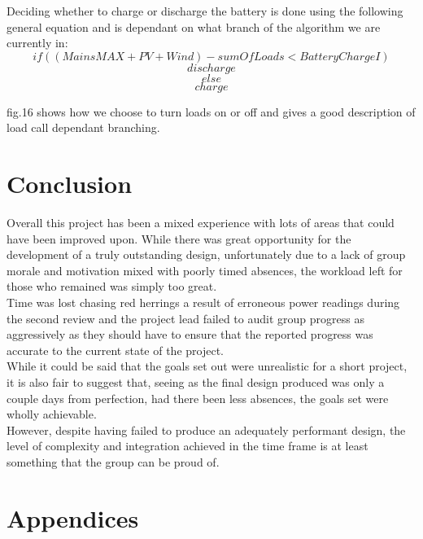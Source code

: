 \documentclass[9pt, technote, a4paper, nofonttune]{IEEEphot}
\begin{document}
Deciding whether to charge or discharge the battery is done using the following general equation and is dependant on what branch of the algorithm we are currently in:
\[if( (MainsMAX + PV + Wind) - sumOfLoads < BatteryChargeI  )\]
\[discharge \]
\[else\]
\[charge\]

fig.16 shows how we choose to turn loads on or off and gives a good description of load call dependant branching.



\section{Conclusion}\vspace*{12pt}

\hspace{0.5cm}Overall this project has been a mixed experience with lots of areas that could have been improved upon.  While there was great opportunity for the development of a truly outstanding design, unfortunately due to a lack of group morale and motivation mixed with poorly timed absences, the workload left for those who remained was simply too great.\\

\hspace{0.5cm}Time was lost chasing red herrings a result of erroneous power readings during the second review and the project lead failed to audit group progress as aggressively as they should have to ensure that the reported progress was accurate to the current state of the project.\\

\hspace{0.5cm}While it could be said that the goals set out were unrealistic for a short project, it is also fair to suggest that, seeing as the final design produced was only a couple days from perfection, had there been less absences, the goals set were wholly achievable.\\

\hspace{0.5cm}However, despite having failed to produce an adequately performant design, the level of complexity and integration achieved in the time frame is at least something that the group can be proud of.
\newpage

\section{Appendices}
\end{document}
